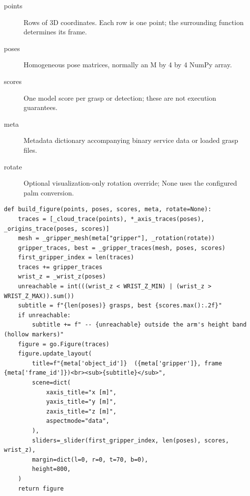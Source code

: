 \documentclass[11pt,a4paper]{book}
\begin{document}
\begin{description}
\item[points] Rows of 3D coordinates. Each row is one point; the surrounding function determines its frame.
\item[poses] Homogeneous pose matrices, normally an M by 4 by 4 NumPy array.
\item[scores] One model score per grasp or detection; these are not execution guarantees.
\item[meta] Metadata dictionary accompanying binary service data or loaded grasp files.
\item[rotate] Optional visualization-only rotation override; None uses the configured palm conversion.
\end{description}

\begin{lstlisting}[firstnumber=177]
def build_figure(points, poses, scores, meta, rotate=None):
    traces = [_cloud_trace(points), *_axis_traces(poses), _origins_trace(poses, scores)]
    mesh = _gripper_mesh(meta["gripper"], _rotation(rotate))
    gripper_traces, best = _gripper_traces(mesh, poses, scores)
    first_gripper_index = len(traces)
    traces += gripper_traces
    wrist_z = _wrist_z(poses)
    unreachable = int(((wrist_z < WRIST_Z_MIN) | (wrist_z > WRIST_Z_MAX)).sum())
    subtitle = f"{len(poses)} grasps, best {scores.max():.2f}"
    if unreachable:
        subtitle += f" -- {unreachable} outside the arm's height band (hollow markers)"
    figure = go.Figure(traces)
    figure.update_layout(
        title=f"{meta['object_id']}  ({meta['gripper']}, frame {meta['frame_id']})<br><sub>{subtitle}</sub>",
        scene=dict(
            xaxis_title="x [m]",
            yaxis_title="y [m]",
            zaxis_title="z [m]",
            aspectmode="data",
        ),
        sliders=_slider(first_gripper_index, len(poses), scores, wrist_z),
        margin=dict(l=0, r=0, t=70, b=0),
        height=800,
    )
    return figure


\end{lstlisting}
\end{document}
